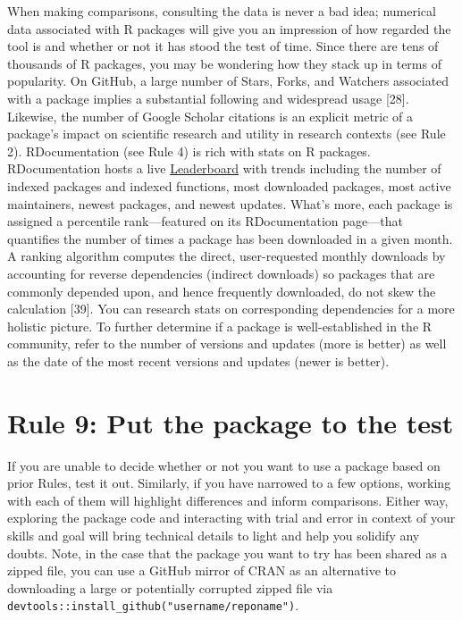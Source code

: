 \documentclass[10pt,letterpaper]{article}
\begin{document}
When making comparisons, consulting the data is never a bad idea;
numerical data associated with R packages will give you an impression of
how regarded the tool is and whether or not it has stood the test of
time. Since there are tens of thousands of R packages, you may be
wondering how they stack up in terms of popularity. On GitHub, a large
number of Stars, Forks, and Watchers associated with a package implies a
substantial following and widespread usage {[}28{]}. Likewise, the
number of Google Scholar citations is an explicit metric of a package's
impact on scientific research and utility in research contexts (see Rule
2). RDocumentation (see Rule 4) is rich with stats on R packages.
RDocumentation hosts a live
\href{https://www.rdocumentation.org/trends}{Leaderboard} with trends
including the number of indexed packages and indexed functions, most
downloaded packages, most active maintainers, newest packages, and
newest updates. What's more, each package is assigned a percentile
rank---featured on its RDocumentation page---that quantifies the number
of times a package has been downloaded in a given month. A ranking
algorithm computes the direct, user-requested monthly downloads by
accounting for reverse dependencies (indirect downloads) so packages
that are commonly depended upon, and hence frequently downloaded, do not
skew the calculation {[}39{]}. You can research stats on corresponding
dependencies for a more holistic picture. To further determine if a
package is well-established in the R community, refer to the number of
versions and updates (more is better) as well as the date of the most
recent versions and updates (newer is better).

\hypertarget{rule-9-put-the-package-to-the-test}{%
\section{Rule 9: Put the package to the
test}\label{rule-9-put-the-package-to-the-test}}

If you are unable to decide whether or not you want to use a package
based on prior Rules, test it out. Similarly, if you have narrowed to a
few options, working with each of them will highlight differences and
inform comparisons. Either way, exploring the package code and
interacting with trial and error in context of your skills and goal will
bring technical details to light and help you solidify any doubts. Note,
in the case that the package you want to try has been shared as a zipped
file, you can use a GitHub mirror of CRAN as an alternative to
downloading a large or potentially corrupted zipped file via
\texttt{devtools::install\_github("username/reponame")}.
\end{document}

